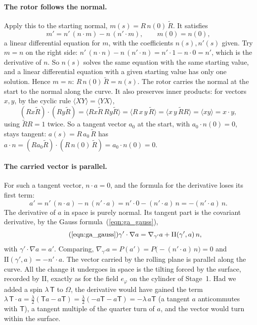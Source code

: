 \paragraph{The rotor follows the normal.} Apply this to the starting normal, $m(s) = R\, n(0)\, \widetilde R$. It satisfies
\begin{equation*}
m' = n'\,(n\cdot m) - n\,(n'\cdot m), \qquad m(0) = n(0) ,
\end{equation*}
a linear differential equation for $m$, with the coefficients $n(s), n'(s)$ given. Try $m = n$ on the right side: $n'\,(n\cdot n) - n\,(n'\cdot n) = n'\cdot 1 - n\cdot 0 = n'$, which is the derivative of $n$. So $n(s)$ solves the same equation with the same starting value, and a linear differential equation with a given starting value has only one solution. Hence $m = n$: $R\, n(0)\,\widetilde R = n(s)$. The rotor carries the normal at the start to the normal along the curve. It also preserves inner products: for vectors $x, y$, by the cyclic rule $\langle XY\rangle = \langle YX\rangle$,
\begin{equation*}
(R x\widetilde R)\cdot(R y\widetilde R) = \langle R x\widetilde R\, R y\widetilde R\rangle = \langle R\, x\, y\,\widetilde R\rangle = \langle x\, y\,\widetilde R R\rangle = \langle x y\rangle = x\cdot y ,
\end{equation*}
using $\widetilde R R = 1$ twice. So a tangent vector $a_0$ at the start, with $a_0\cdot n(0) = 0$, stays tangent: $a(s) = R\, a_0\,\widetilde R$ has $a\cdot n = (R a_0\widetilde R)\cdot(R\, n(0)\,\widetilde R) = a_0\cdot n(0) = 0$.

\paragraph{The carried vector is parallel.} For such a tangent vector, $n\cdot a = 0$, and the formula for the derivative loses its first term:
\begin{equation*}
a' = n'\,(n\cdot a) - n\,(n'\cdot a) = n'\cdot 0 - (n'\cdot a)\, n = -(n'\cdot a)\, n .
\end{equation*}
The derivative of $a$ in space is purely normal. Its tangent part is the covariant derivative, by the Gauss formula~(\ref{eqn:ga_gauss}),
\begin{equation*}
\tag{\ref{eqn:ga_gauss}}
\gamma'\cdot\nabla a = \nabla_{\gamma'} a + \mathrm{II}(\gamma', a)\, n ,
\end{equation*}
with $\gamma'\cdot\nabla a = a'$. Comparing, $\nabla_{\gamma'} a = P(a') = P\big(-(n'\cdot a)\,n\big) = 0$ and $\mathrm{II}(\gamma', a) = -n'\cdot a$. The vector carried by the rolling plane is parallel along the curve. All the change it undergoes in space is the tilting forced by the surface, recorded by $\mathrm{II}$, exactly as for the field $e_\varphi$ on the cylinder of Stage~1. Had we added a spin $\lambda\,\mathsf T$ to $\Omega$, the derivative would have gained the term $\lambda\,\mathsf T\cdot a = \frac\lambda2(\mathsf Ta - a\mathsf T) = \frac\lambda2(-a\mathsf T - a\mathsf T) = -\lambda\, a\mathsf T$ (a tangent $a$ anticommutes with $\mathsf T$), a tangent multiple of the quarter turn of $a$, and the vector would turn within the surface.

